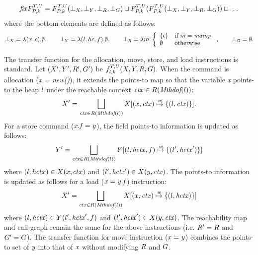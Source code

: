 \[
{\it fix} F^{T,U}_{P,k} = F^{T,U}_{P,k} (\bot_X, \bot_Y, \bot_R, \bot_G) \sqcup F^{T,U}_{P,k} (F^{T,U}_{P,k} (\bot_X, \bot_Y, \bot_R, \bot_G)) \sqcup \dots
\]
where the bottom elements are defined as follows:
\[
  \bot_X = \lambda (x,c).\emptyset, \qquad   \bot_Y = \lambda (l,hc,f).\emptyset, \qquad \bot_R =
\lambda m. \left\{ \begin{array}{ll} \{ \epsilon \} & \mbox{if}~m =
                                                        \text{\it main}_P \\
                     \emptyset & \mbox{otherwise} \end{array} \right., \qquad
  \bot_G = \emptyset.
\]


The transfer function for the allocation, move, store, and load instructions is standard.
Let $(X', Y', R',G')$ be $f^{T, U}_{l, k}(X, Y,R,G)$. 
When the command is allocation ({\it x
  = new()}), it extends the points-to map so that the variable {\it x}
points-to the heap $l$ under the reachable context ${\it ctx} \in R(\text{\it Mthdof}(l))$: 
\[
\vspace{-0.3em}
\ptsto' = \bigsqcup_{\ctx \in \reachable(\mthdof(l))} \ptsto [ (x,
\ctx)\weakupdate \myset{(l, \ctx)} ].
\]
For a store command 
({\it ${\it x.f = y}$}), the field points-to information is updated as follows:
\[
\vspace{-0.3em}
\fptsto' = \bigsqcup_{\ctx \in \reachable(\mthdof(l))} \fptsto [(l,
\hctx,f)\weakupdate \myset{(l', \hctx')} ]
\]
where $(l,hctx) \in X(x,ctx)$ and $(l',{\it hctx}') \in
X(y,{\it ctx})$. The points-to information is updated as follows for a
load (${\it x = y.f}$) instruction: 
\[
\vspace{-0.3em}
\ptsto' = \bigsqcup_{\ctx \in \reachable(\mthdof(l))} \ptsto [(x,
\ctx)\weakupdate \myset{(l, \hctx)}]
\]
where $(l,{\it hctx}) \in Y(l',{\it hctx}',f)$ and $(l',{\it hctx}') \in X(y,{\it ctx})$.
The reachability map and call-graph remain the same for the above instructions (i.e. $R'=R$ and $G'=G$). 
The transfer function for move instruction ($\it x = y$) combines the points-to set of
${\it y}$ into that of ${\it x}$ without modifying $R$ and $G$.

